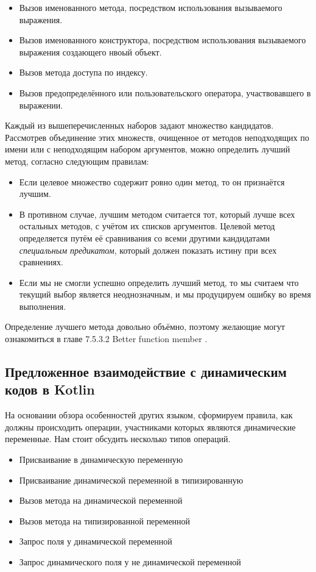 \begin{itemize}
    \item Вызов именованного метода, посредством использования вызываемого выражения.
    \item Вызов именованного конструктора, посредством использования вызываемого выражения создающего нвоый объект.
    \item Вызов метода доступа по индексу.
    \item Вызов предопределённого или пользовательского оператора, участвовавшего в выражении.
\end{itemize}

Каждый из вышеперечисленных наборов задают множество кандидатов. Рассмотрев объединение этих множеств, очищенное от методов неподходящих по имени или с неподходящим набором аргументов, можно определить лучший метод, согласно следующим правилам:

\begin{itemize}
    \item Если целевое множество содержит ровно один метод, то он признаётся лучшим.
    \item В противном случае, лучшим методом считается тот, который лучше всех остальных методов, с учётом их списков аргументов. Целевой метод определяется путём её сравнивания со всеми другими кандидатами \textit{специальным предикатом}, который должен показать истину при всех сравнениях.
    \item Если мы не смогли успешно определить лучший метод, то мы считаем что текущий выбор является неоднозначным, и мы продуцируем ошибку во время выполнения.
\end{itemize}

Определение лучшего метода довольно объёмно, поэтому желающие могут ознакомиться в главе 7.5.3.2 Better function member \cite{csharp:languageSpecification}.


\subsection{Предложенное взаимодействие с динамическим кодов в Kotlin}

На основании обзора особенностей других языком, сформируем правила, как должны происходить операции, участниками которых являются динамические переменные. Нам стоит обсудить несколько типов операций.

\begin{itemize}
    \item Присваивание в динамическую переменную
    \item Присваивание динамической переменной в типизированную
    \item Вызов метода на динамической переменной
    \item Вызов метода на типизированной переменной
    \item Запрос поля у динамической переменной
    \item Запрос динамического поля у не динамической переменной
\end{itemize}

